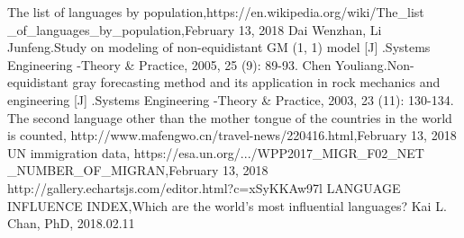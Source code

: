 
\begin{thebibliography}{99}
		

	
	The list of languages by population,https://en.wikipedia.org/wiki/The\_list
	\_of\_languages\_by\_population,February 13, 2018
		Dai Wenzhan, Li Junfeng.Study on modeling of non-equidistant GM (1, 1) model [J] .Systems Engineering -Theory \& Practice, 2005, 25 (9): 89-93.
	Chen Youliang.Non-equidistant gray forecasting method and its application in rock mechanics and engineering [J] .Systems Engineering -Theory \& Practice, 2003, 23 (11): 130-134.
	The second language other than the mother tongue of the countries in the world is counted,	http://www.mafengwo.cn/travel-news/220416.html,February 13, 2018
	UN immigration data,	https://esa.un.org/.../WPP2017\_MIGR\_F02\_NET
	\_NUMBER\_OF\_MIGRAN,February 13, 2018
		http://gallery.echartsjs.com/editor.html?c=xSyKKAw97l
		LANGUAGE INFLUENCE INDEX,Which are the world’s most influential languages? Kai L. Chan, PhD, 2018.02.11

\end{thebibliography}

%
%